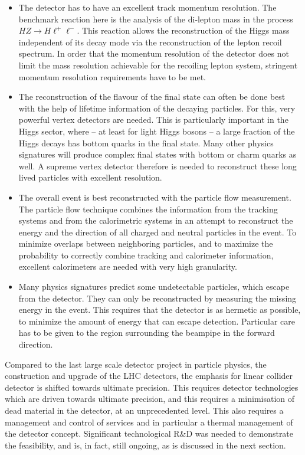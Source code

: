 \documentclass[%
 reprint,
 amsmath,amssymb,
 aps,
]{revtex4-1}
\newcommand{\jim}[1]{\textcolor{black}{#1}}
\begin{document}
 
\begin{itemize}
 \item The detector has to have an excellent track momentum
   resolution. The benchmark reaction here is the analysis 
of the di-lepton mass in the process $HZ \to H \ell^+
\ell^-$. This reaction allows the reconstruction of the 
Higgs mass independent of its decay mode via the 
reconstruction of the lepton recoil spectrum. In order that 
the momentum resolution of the detector does not limit 
the mass resolution achievable for the recoiling lepton 
system, stringent momentum resolution requirements have to be met. 
\item The reconstruction of the flavour of the final state can 
often be done best with the help of lifetime information of the 
decaying particles. For this, very powerful vertex detectors 
are needed. This is particularly important 
in the Higgs sector, where -- at least for light Higgs bosons -- 
a large fraction of the Higgs decays has bottom 
quarks in the final state. Many other physics signatures will 
produce complex final states with bottom or charm quarks as well. 
A supreme vertex detector therefore is needed to reconstruct these 
long lived particles with excellent resolution. 
\item The overall event is best reconstructed with the 
particle flow measurement. The particle flow technique combines 
the information from the tracking systems and from the 
calorimetric systems in an attempt to reconstruct the 
energy and the direction of all charged and 
neutral particles in the event. To minimize overlaps between 
neighboring particles, and to maximize the probability to 
correctly combine tracking and calorimeter information, 
excellent calorimeters are needed with very high granularity. 
\item Many physics signatures predict some undetectable particles, 
which escape from the detector. They can only be reconstructed by 
measuring the missing energy in the event. This requires 
that the detector is as hermetic as possible, to 
minimize the amount of energy that can escape detection. 
Particular care has to be given to the region surrounding the 
beampipe in the forward direction. 
\end{itemize}

Compared to the last large scale detector project in particle physics, the construction and upgrade of the LHC detectors, the emphasis for linear collider detector is shifted towards ultimate precision. This requires \jim{detector technologies} which are driven towards ultimate precision, and this requires a minimisation of dead material in the detector, at an unprecedented level. This also requires a management and control of services and in particular a thermal management of the detector concept. Significant technological R\&D was needed to demonstrate the feasibility, and is, in fact, still ongoing, as \jim{is} discussed in the \jim{next} section.  
\end{document}
